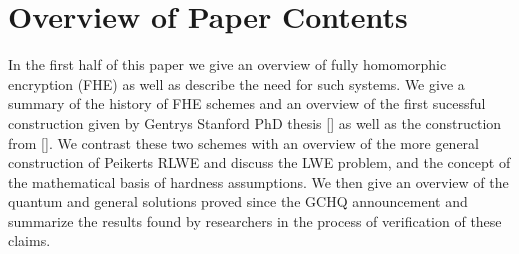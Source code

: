 \section{Overview of Paper Contents}

In the first half of this paper we give an overview of fully
homomorphic encryption (FHE) as well as describe the need for such
systems.
We give a summary of the history of FHE schemes and an overview of
the first sucessful construction given by Gentrys Stanford PhD thesis
[\cite{gen20090}] as well as the construction from [\cite{sma20101}].
We contrast these two schemes with an overview of the more general
construction of Peikerts RLWE and discuss the LWE problem, and the
concept of the mathematical basis of hardness assumptions.
We then give an overview of the quantum and general solutions proved
since the GCHQ announcement and summarize the results found by
researchers in the process of verification of these claims.